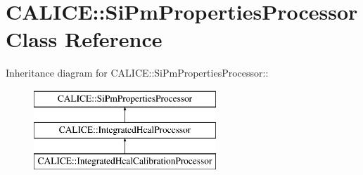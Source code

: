 \section{CALICE::SiPmPropertiesProcessor Class Reference}
\label{classCALICE_1_1SiPmPropertiesProcessor}
Inheritance diagram for CALICE::SiPmPropertiesProcessor::\begin{figure}[H]
\begin{center}
\leavevmode
\includegraphics[height=3cm]{classCALICE_1_1SiPmPropertiesProcessor}
\end{center}
\end{figure}
